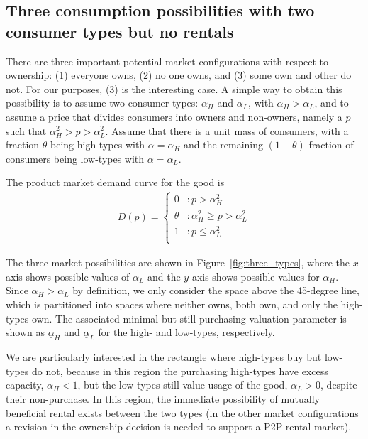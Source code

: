 \documentclass[11pt]{article}
\begin{document}
\subsection{Three consumption possibilities with two consumer types but no rentals} 
There are three important potential market configurations with respect to ownership:
(1) everyone owns, (2) no one owns, and (3) some own and other do not.
For our purposes, (3) is the interesting case.
A simple way to obtain this possibility is to assume two consumer
types: $\alpha_H$ and $\alpha_L$, with $\alpha_H > \alpha_L$, and to assume a price that divides consumers into owners and non-owners, namely a $p$ such that $\alpha_H^2 > p > \alpha_L^2$.
Assume that there is a unit mass of consumers, with a fraction $\theta$ being high-types with $\alpha = \alpha_H$ and the remaining $(1-\theta)$ fraction of consumers being low-types with $\alpha = \alpha_L$. 

The product market demand curve for the good is 
\begin{align} \label{eq:demand}
   D(p) = \left\{
     \begin{array}{ll}
       0 & : p > \alpha_H^2\\
       \theta & : \alpha_H^2 \ge p > \alpha_L^2  \\
       1 & : p \le \alpha_L^2  \\
     \end{array}
   \right. 
\end{align} 

The three market possibilities are shown in Figure~\ref{fig:three_types}, where the $x$-axis shows possible values of $\alpha_L$ and the $y$-axis shows possible values for $\alpha_H$. 
Since $\alpha_H > \alpha_L$ by definition, we only consider the space above the 45-degree line, which is partitioned into spaces where neither owns, both own, and only the high-types own. 
The associated minimal-but-still-purchasing valuation parameter is shown as $\underline{\alpha}_H$ and $\underline{\alpha}_L$ for the high- and low-types, respectively. 

We are particularly interested in the rectangle where high-types buy but low-types do not, because in this region the purchasing high-types have excess capacity, $\alpha_H < 1$, but the low-types still value usage of the good, $\alpha_L > 0$, despite their non-purchase. 
In this region, the immediate possibility of mutually beneficial rental exists between the two types (in the other market configurations a revision in the ownership decision is needed to support a P2P rental market). 
\end{document}
